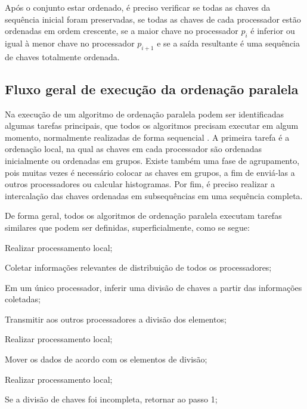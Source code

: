 Após o conjunto estar ordenado, é preciso verificar se todas as chaves da sequência inicial foram preservadas, se todas as chaves de cada processador estão ordenadas em ordem crescente, se a maior chave no processador $p_{i}$ é inferior ou igual à menor chave no processador $p_{i+1}$ e se a saída resultante é uma sequência de chaves totalmente ordenada.


\subsection{Fluxo geral de execução da ordenação paralela}

Na execução de um algoritmo de ordenação paralela podem ser identificadas algumas tarefas principais, que todos os algoritmos precisam executar em algum momento, normalmente realizadas de forma sequencial  \cite{Kale:2010}. 
A primeira tarefa é a ordenação local, na qual as chaves em cada processador são ordenadas inicialmente  ou ordenadas em grupos.
Existe também uma fase de agrupamento, pois muitas vezes é necessário colocar as chaves em grupos, a fim de enviá-las a outros processadores ou calcular histogramas. Por fim, é preciso realizar a intercalação das chaves ordenadas em subsequências em uma sequência completa.


De forma geral, todos os algoritmos de ordenação paralela executam tarefas similares que podem ser definidas, superficialmente, como se segue: 
\begin{num_enum}
\item Realizar processamento local;
\item Coletar informações relevantes de distribuição de todos os processadores;
\item Em um único processador, inferir uma divisão de chaves a partir das informações coletadas;
\item Transmitir aos outros processadores a divisão dos elementos;
\item Realizar processamento local;
\item Mover os dados de acordo com os elementos de divisão;
\item Realizar processamento local;
\item Se a divisão de chaves foi incompleta, retornar ao passo 1;
\end{num_enum}

